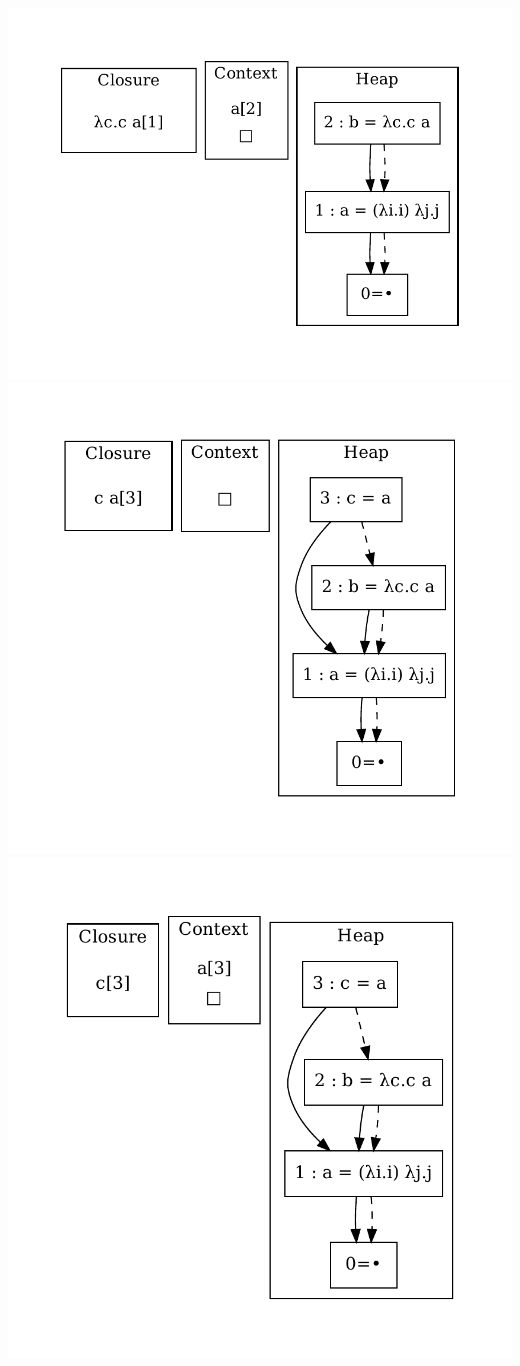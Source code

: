 \includegraphics[width=0.99\linewidth/2]{figures/8.pdf}
\includegraphics[width=0.99\linewidth/2]{figures/9.pdf}
\includegraphics[width=0.99\linewidth/2]{figures/10.pdf}
